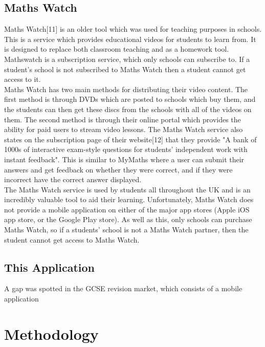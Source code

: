 \documentclass{article}
\begin{document}
\subsection{Maths Watch}

Maths Watch[11] is an older tool which was used for teaching purposes in schools. This is a service which provides educational videos for students to learn from. It is designed to replace both classroom teaching and as a homework tool. Mathswatch is a subscription service, which only schools can subscribe to. If a student's school is not subscribed to Maths Watch then a student cannot get access to it. \\

Maths Watch has two main methods for distributing their video content. The first method is through DVDs which are posted to schools which buy them, and the students can then get these discs from the schools with all of the videos on them. The second method is through their online portal which provides the ability for paid users to stream video lessons. The Maths Watch service also states on the subscription page of their website[12] that they provide "A bank of 1000s of interactive exam-style questions for students' independent work with instant feedback". This is similar to MyMaths where a user can submit their answers and get feedback on whether they were correct, and if they were incorrect have the correct answer displayed. \\

The Maths Watch service is used by students all throughout the UK and is an incredibly valuable tool to aid their learning. Unfortunately, Maths Watch does not provide a mobile application on either of the major app stores (Apple iOS app store, or the Google Play store). As well as this, only schools can purchase Maths Watch, so if a students' school is not a Maths Watch partner, then the student cannot get access to Maths Watch. \\

\subsection{This Application}

A gap was spotted in the GCSE revision market, which consists of a mobile application 

\section{Methodology}
\label{section:methodology}
\end{document}
